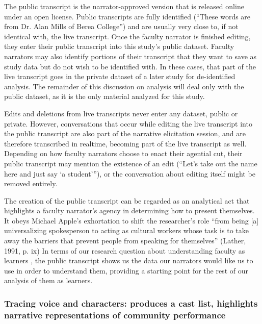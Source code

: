 The public transcript is the narrator-approved version that is released online under an open license. Public transcripts are fully identified (“These words are from Dr. Alan Mills of Berea College”) and are usually very close to, if not identical with, the live transcript. Once the faculty narrator is finished editing, they enter their public transcript into this study's public dataset. Faculty narrators may also identify portions of their transcript that they want to save as study data but do not wish to be identified with. In these cases, that part of the live transcript goes in the private dataset of a later study for de-identified analysis. The remainder of this discussion on analysis will deal only with the public dataset, as it is the only material analyzed for this study.

Edits and deletions from live transcripts never enter any dataset, public or private. However, conversations that occur while editing the live transcript into the public transcript are also part of the narrative elicitation session, and are therefore transcribed in realtime, becoming part of the live transcript as well. Depending on how faculty narrators choose to enact their agential cut, their public transcript may mention the existence of an edit (“Let’s take out the name here and just say ‘a student’”), or the conversation about editing itself might be removed entirely.

The creation of the public transcript can be regarded as an analytical act that highlights a faculty narrator’s agency in determining how to present themselves. It obeys Michael Apple’s exhortation to shift the researcher’s role “from being [a] universalizing spokesperson to acting as cultural workers whose task is to take away the barriers that prevent people from speaking for themselves” (Lather, 1991, p. ix) In terms of our research question about understanding faculty as learners , the public transcript shows us the data our narrators would like us to use in order to understand them, providing a starting point for the rest of our analysis of them as learners.

\subsubsection{Tracing voice and characters: produces a cast list, highlights narrative representations of community performance}

